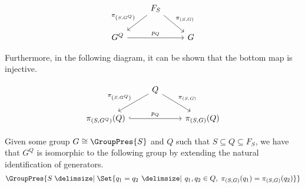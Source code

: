 \begin{equation*}
	\begin{tikzcd}
		& F_S \ar[dl, "\pi_{\left(S,G^Q\right)}"'] \ar[dr, "\pi_{\left(S,G\right)}"] &
		\\ G^Q \ar[rr, "p_Q"]  & & G
	\end{tikzcd}
\end{equation*}

Furthermore, in the following diagram, it can be shown that the bottom map is injective.

\begin{equation*}
	\begin{tikzcd}
		& Q \ar[dl, "\pi_{\left(S,G^Q\right)}"'] \ar[dr, "\pi_{\left(S,G\right)}"] &
		\\ \pi_{\left( S,G^Q \right)} (Q) \ar[rr, hook, "p_Q"]  & & \pi_{\left( S,G \right)}(Q)
	\end{tikzcd}
	\label{eqn:injectivity_of_P_Q_on_Q}
\end{equation*}

\begin{lemma}
	\label{lem:alternative_presentation_for_G_Q}
	Given some group $G \cong \GroupPres{S}$ and $Q$ such that $S \subseteq Q \subseteq F_S$, we have that $G^Q$ is isomorphic to the following group by extending the natural identification of generators.
	\begin{equation*}
		\GroupPres{S \relations \Set{q_1 = q_2 \given q_1,q_2 \in Q, \; \pi_{(S,G) }(q_1) = \pi_{(S,G)}(q_2)}}
	\end{equation*}
\end{lemma}

